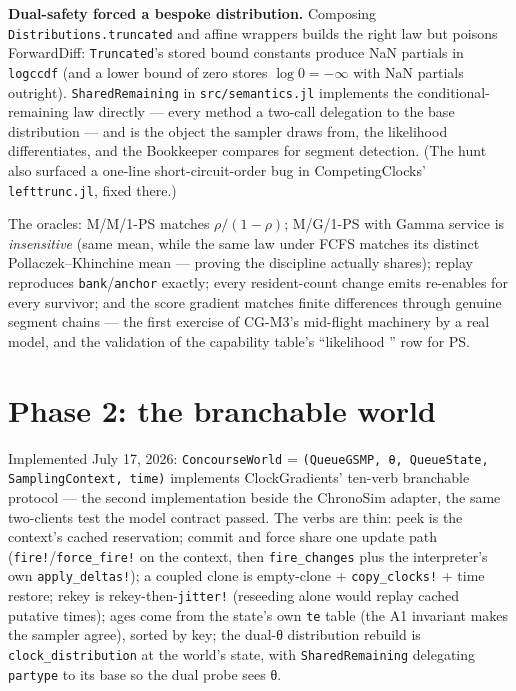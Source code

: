 \documentclass[11pt]{article}
\newcommand{\code}[1]{\texttt{#1}}
\begin{document}
\textbf{Dual-safety forced a bespoke distribution.} Composing
\code{Distributions.truncated} and affine wrappers builds the right law but
poisons ForwardDiff: \code{Truncated}'s stored bound constants produce NaN
partials in \code{logccdf} (and a lower bound of zero stores
$\log 0 = -\infty$ with NaN partials outright). \code{SharedRemaining} in
\code{src/semantics.jl} implements the conditional-remaining law directly
— every method a two-call delegation to the base distribution — and is the
object the sampler draws from, the likelihood differentiates, and the
Bookkeeper compares for segment detection. (The hunt also surfaced a
one-line short-circuit-order bug in CompetingClocks'
\code{lefttrunc.jl}, fixed there.)

The oracles: M/M/1-PS matches $\rho/(1-\rho)$; M/G/1-PS with Gamma service
is \emph{insensitive} (same mean, while the same law under FCFS matches its
distinct Pollaczek--Khinchine mean — proving the discipline actually
shares); replay reproduces \code{bank}/\code{anchor} exactly; every
resident-count change emits re-enables for every survivor; and the score
gradient matches finite differences through genuine segment chains — the
first exercise of CG-M3's mid-flight machinery by a real model, and the
validation of the capability table's ``likelihood \checkmark'' row for PS.

\section{Phase 2: the branchable world}
\label{sec:branchable}

Implemented July 17, 2026: \code{ConcourseWorld} =
\code{(QueueGSMP, θ, QueueState, SamplingContext, time)} implements
ClockGradients' ten-verb branchable protocol — the second implementation
beside the ChronoSim adapter, the same two-clients test the model contract
passed. The verbs are thin: peek is the context's cached reservation;
commit and force share one update path (\code{fire!}/\code{force\_fire!} on
the context, then \code{fire\_changes} plus the interpreter's own
\code{apply\_deltas!}); a coupled clone is empty-clone +
\code{copy\_clocks!} + time restore; rekey is rekey-then-\code{jitter!}
(reseeding alone would replay cached putative times); ages come from the
state's own \code{te} table (the A1 invariant makes the sampler agree),
sorted by key; the dual-θ distribution rebuild is
\code{clock\_distribution} at the world's state, with
\code{SharedRemaining} delegating \code{partype} to its base so the dual
probe sees θ.
\end{document}
